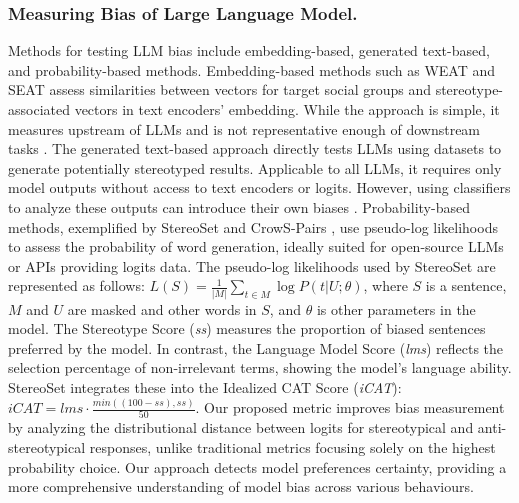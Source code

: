 \subsubsection{{Measuring Bias of Large Language Model.}}
Methods for testing LLM bias include embedding-based, generated text-based, and probability-based methods. Embedding-based methods such as WEAT \cite{caliskanSemanticsDerivedAutomatically2017} and SEAT \cite{mayMeasuringSocialBiases2019} assess similarities between vectors for target social groups and stereotype-associated vectors in text encoders' embedding. While the approach is simple, it measures upstream of LLMs and is not representative enough of downstream tasks \cite{cabelloIndependenceAssociationBias2023}. The generated text-based approach directly tests LLMs using datasets to generate potentially stereotyped results. Applicable to all LLMs, it requires only model outputs without access to text encoders or logits. However, using classifiers to analyze these outputs can introduce their own biases \cite{pozzobonChallengesUsingBlackBox2023}. Probability-based methods, exemplified by StereoSet \cite{nadeemStereoSetMeasuringStereotypical2020} and CrowS-Pairs \cite{nangiaCrowSPairsChallengeDataset2020}, use pseudo-log likelihoods to assess the probability of word generation, ideally suited for open-source LLMs or APIs providing logits data. The pseudo-log likelihoods used by StereoSet \cite{nadeemStereoSetMeasuringStereotypical2020} are represented as follows: $L(S)=\frac{1}{|M|}\sum_{t \in M}\log P(t|U;\theta)$\label{mlmfs}, where $S$ is a sentence, $M$ and $U$ are masked and other words in $S$, and $\theta$ is other parameters in the model. The Stereotype Score (\textit{ss}) measures the proportion of biased sentences preferred by the model. In contrast, the Language Model Score (\textit{lms}) reflects the selection percentage of non-irrelevant terms, showing the model's language ability. StereoSet \cite{nadeemStereoSetMeasuringStereotypical2020} integrates these into the Idealized CAT Score (\textit{iCAT}): $iCAT = lms \cdot \frac{min((100 - ss), ss)}{50}$\label{icat}. Our proposed metric improves bias measurement by analyzing the distributional distance between logits for stereotypical and anti-stereotypical responses, unlike traditional metrics focusing solely on the highest probability choice. Our approach detects model preferences certainty, providing a more comprehensive understanding of model bias across various behaviours.

